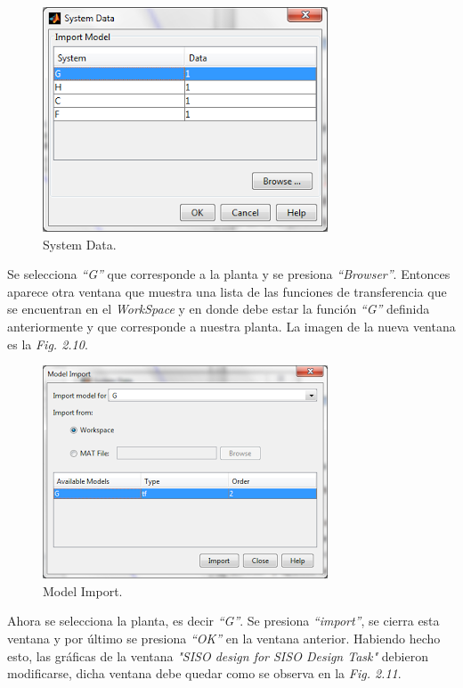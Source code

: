 \documentclass[a4paper,12pt,twoside]{proyectotanquesecci}
\begin{document}
\begin{figure}[h]
\centering
\includegraphics[scale=0.7]{Ventana3}
\renewcommand{\figurename}{Fig.}
\caption{System Data.}
\label{System Data.}
\end{figure}

Se selecciona \textit{“G”} que corresponde a la planta y se presiona \textit{“Browser”}. Entonces aparece otra ventana que muestra una lista de las funciones de transferencia que se encuentran en el \textit{WorkSpace} y en donde debe estar la función \textit{“G”} definida anteriormente y que corresponde a nuestra planta. La imagen de la nueva ventana es la \textit{Fig. 2.10}. \\

\begin{figure}[h]
\centering
\includegraphics[scale=0.7]{Ventana4}
\renewcommand{\figurename}{Fig.}
\caption{Model Import.}
\label{Model Import.}
\end{figure}

Ahora se selecciona la planta, es decir \textit{“G”}. Se presiona \textit{“import”}, se cierra esta ventana y por último se presiona \textit{“OK”} en la ventana anterior. Habiendo hecho esto, las gráficas de la ventana \textit{"SISO design for SISO Design Task"} debieron modificarse, dicha ventana debe quedar como se observa en la \textit{Fig. 2.11}. \\
\end{document}
